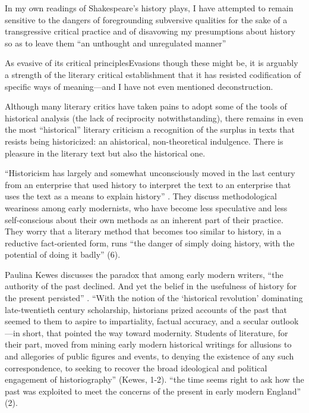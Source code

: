 In my own readings of Shakespeare's history plays, I have attempted to remain sensitive to the dangers of foregrounding subversive qualities for the sake of a transgressive critical practice and of disavowing my presumptions about history so as to leave them ``an unthought and unregulated manner'' \cite[743]{Liu}

As evasive of its critical principlesEvasions though these might be, it is arguably a strength of the literary critical establishment that it has resisted codification of specific ways of meaning---and I have not even mentioned deconstruction.

Although many literary critics have taken pains to adopt some of the tools of historical analysis (the lack of reciprocity notwithstanding), there remains in even the most ``historical'' literary criticism a recognition of the surplus in texts that resists being historicized: an ahistorical, non-theoretical indulgence. There is pleasure in the literary text but also the historical one.

``Historicism has largely and somewhat unconsciously moved in the last century from an enterprise that used history to interpret the text to an enterprise that uses the text as a means to explain history'' \cite[7]{Fulton/Coiro}. They discuss methodological weariness among early modernists, who have become less speculative and less self-conscious about their own methods as an inherent part of their practice. They worry that a literary method that becomes too similar to history, in a reductive fact-oriented form, runs ``the danger of simply doing history, with the potential of doing it badly'' (6).

Paulina Kewes discusses the paradox that among early modern writers, ``the authority of the past declined. And yet the belief in the usefulness of history for the present persisted'' \cite[1]{Kewes, History and Its Uses, 1-30}. ``With the notion of the `historical revolution' dominating late-twentieth century scholarship, historians prized accounts of the past that seemed to them to aspire to impartiality, factual accuracy, and a secular outlook---in short, that pointed the way toward modernity. Students of literature, for their part, moved from mining early modern historical writings for allusions to and allegories of public figures and events, to denying the existence of any such correspondence, to seeking to recover the broad ideological and political engagement of historiography'' (Kewes, 1-2). ``the time seems right to ask how the past was exploited to meet the concerns of the present in early modern England'' (2).

